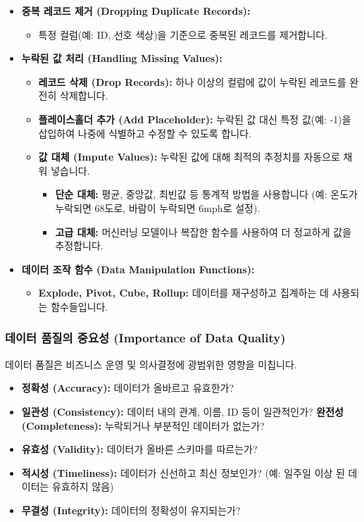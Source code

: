\documentclass[11pt,a4paper]{article}
\theoremstyle{definition}
\begin{document}
\begin{enumerate}
\begin{itemize}
    \item \textbf{중복 레코드 제거 (Dropping Duplicate Records):}
    \begin{itemize}
        \item 특정 컬럼(예: ID, 선호 색상)을 기준으로 중복된 레코드를 제거합니다.
    \end{itemize}
    \item \textbf{누락된 값 처리 (Handling Missing Values):}
    \begin{itemize}
        \item \textbf{레코드 삭제 (Drop Records):} 하나 이상의 컬럼에 값이 누락된 레코드를 완전히 삭제합니다.
        \item \textbf{플레이스홀더 추가 (Add Placeholder):} 누락된 값 대신 특정 값(예: -1)을 삽입하여 나중에 식별하고 수정할 수 있도록 합니다.
        \item \textbf{값 대체 (Impute Values):} 누락된 값에 대해 최적의 추정치를 자동으로 채워 넣습니다.
        \begin{itemize}
            \item \textbf{단순 대체:} 평균, 중앙값, 최빈값 등 통계적 방법을 사용합니다 (예: 온도가 누락되면 68도로, 바람이 누락되면 6mph로 설정).
            \item \textbf{고급 대체:} 머신러닝 모델이나 복잡한 함수를 사용하여 더 정교하게 값을 추정합니다.
        \end{itemize}
    \end{itemize}
    \item \textbf{데이터 조작 함수 (Data Manipulation Functions):}
    \begin{itemize}
        \item \textbf{Explode, Pivot, Cube, Rollup:} 데이터를 재구성하고 집계하는 데 사용되는 함수들입니다.
    \end{itemize}
\end{itemize}

\subsubsection{데이터 품질의 중요성 (Importance of Data Quality)}
데이터 품질은 비즈니스 운영 및 의사결정에 광범위한 영향을 미칩니다.

\begin{itemize}
    \item \textbf{정확성 (Accuracy):} 데이터가 올바르고 유효한가?
    \item \textbf{일관성 (Consistency):} 데이터 내의 관계, 이름, ID 등이 일관적인가?
    \textbf{완전성 (Completeness):} 누락되거나 부분적인 데이터가 없는가?
    \item \textbf{유효성 (Validity):} 데이터가 올바른 스키마를 따르는가?
    \item \textbf{적시성 (Timeliness):} 데이터가 신선하고 최신 정보인가? (예: 일주일 이상 된 데이터는 유효하지 않음)
    \item \textbf{무결성 (Integrity):} 데이터의 정확성이 유지되는가?
\end{itemize}


\end{enumerate}
\end{document}

